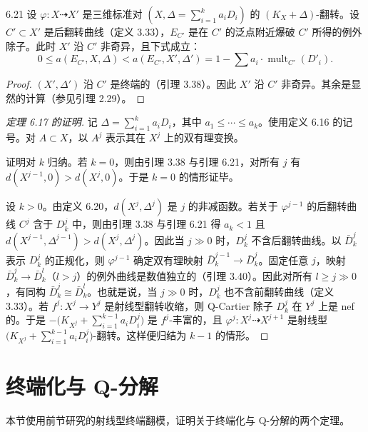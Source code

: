 \begin{lemmap}{6.21}
设 $\varphi:X\dashrightarrow X'$ 是三维标准对 $(X,\Delta=\sum_{i=1}^k a_iD_i)$ 的 $(K_X+\Delta)$-翻转。设 $C'\subset X'$ 是后翻转曲线（定义 3.33），$E_{C'}$ 是在 $C'$ 的泛点附近爆破 $C'$ 所得的例外除子。此时 $X'$ 沿 $C'$ 非奇异，且下式成立：
\[
0\le a(E_{C'},X,\Delta)<a(E_{C'},X',\Delta')=1-\sum a_i\cdot\operatorname{mult}_{C'}(D'_i).
\]
\end{lemmap}

\begin{proof}
$(X',\Delta')$ 沿 $C'$ 是终端的（引理 3.38）。因此 $X'$ 沿 $C'$ 非奇异。其余是显然的计算（参见引理 2.29）。
\end{proof}

\begin{proof}[定理 6.17 的证明]
记 $\Delta=\sum_{i=1}^k a_iD_i$，其中 $a_1\le\cdots\le a_k$。使用定义 6.16 的记号。对 $A\subset X$，以 $A^j$ 表示其在 $X^j$ 上的双有理变换。

证明对 $k$ 归纳。若 $k=0$，则由引理 3.38 与引理 6.21，对所有 $j$ 有 $d(X^{j-1},0)>d(X^j,0)$。于是 $k=0$ 的情形证毕。

设 $k>0$。由定义 6.20，$d(X^j,\Delta^j)$ 是 $j$ 的非减函数。若关于 $\varphi^{j-1}$ 的后翻转曲线 $C^j$ 含于 $D^j_k$ 中，则由引理 3.38 与引理 6.21 得 $a_k<1$ 且 $d(X^{j-1},\Delta^{j-1})>d(X^j,\Delta^j)$。因此当 $j\gg0$ 时，$D^j_k$ 不含后翻转曲线。以 $\bar D^j_k$ 表示 $D^j_k$ 的正规化，则 $\varphi^{j-1}$ 确定双有理映射 $\bar D^{j-1}_k\to\bar D^j_k$。固定任意 $j$，映射 $\bar D^j_k\to\bar D^l_k$（$l>j$）的例外曲线是数值独立的（引理 3.40）。因此对所有 $l\ge j\gg0$，有同构 $\bar D^j_k\cong\bar D^l_k$。也就是说，当 $j\gg0$ 时，$D^j_k$ 也不含前翻转曲线（定义 3.33）。若 $f^j:X^j\to Y^j$ 是射线型翻转收缩，则 Q-Cartier 除子 $D^j_k$ 在 $Y^j$ 上是 nef 的。于是 $-\bigl(K_{X^j}+\sum_{i=1}^{k-1}a_iD^j_i\bigr)$ 是 $f^j$-丰富的，且 $\varphi^j:X^j\dashrightarrow X^{j+1}$ 是射线型 $\bigl(K_{X^j}+\sum_{i=1}^{k-1}a_iD^j_i\bigr)$-翻转。这样便归结为 $k-1$ 的情形。
\end{proof}

\section{终端化与 Q-分解}

本节使用前节研究的射线型终端翻模，证明关于终端化与 Q-分解的两个定理。

